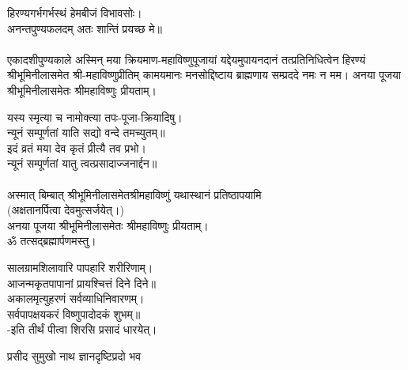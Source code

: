 हिरण्यगर्भगर्भस्थं हेमबीजं विभावसोः।\\
अनन्तपुण्यफलदम् अतः शान्तिं प्रयच्छ मे॥\\
 \\
एकादशीपुण्यकाले अस्मिन् मया क्रियमाण-महाविष्णुपूजायां यद्देयमुपायनदानं तत्प्रतिनिधित्वेन हिरण्यं श्रीभूमिनीलासमेत श्री-महाविष्णुप्रीतिम् 
कामयमानः मनसोद्दिष्टाय ब्राह्मणाय सम्प्रददे नमः न मम। 
अनया पूजया श्रीभूमिनीलासमेतः श्रीमहाविष्णुः प्रीयताम्। 
 
 यस्य स्मृत्या च नामोक्त्या तपः-पूजा-क्रियादिषु।\\
न्यूनं सम्पूर्णतां याति सद्यो वन्दे तमच्युतम्॥ \\
इदं व्रतं मया देव कृतं प्रीत्यै तव प्रभो।\\
न्यूनं सम्पूर्णतां यातु त्वत्प्रसादाज्जनार्द्दन॥\\
 \\
अस्मात् बिम्बात् श्रीभूमिनीलासमेतश्रीमहाविष्णुं यथास्थानं प्रतिष्ठापयामि\\
(अक्षतानर्पित्वा देवमुत्सर्जयेत्।)\\
अनया पूजया श्रीभूमिनीलासमेतः श्रीमहाविष्णुः प्रीयताम्। \\
ॐ तत्सद्ब्रह्मार्पणमस्तु।
 
सालग्रामशिलावारि पापहारि शरीरिणाम्।\\
आजन्मकृतपापानां प्रायश्चित्तं दिने दिने॥\\
अकालमृत्युहरणं सर्वव्याधिनिवारणम्।\\
सर्वपापक्षयकरं विष्णुपादोदकं शुभम्॥ \\
 -इति तीर्थं पीत्वा शिरसि प्रसादं धारयेत्।



{प्रसीद सुमुखो नाथ ज्ञानदृष्टिप्रदो भव}
